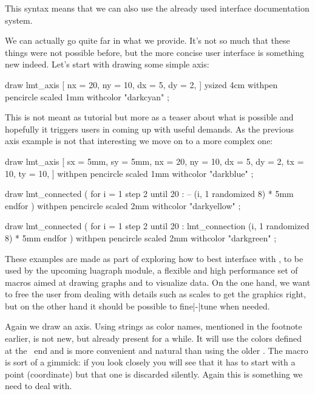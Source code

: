 This syntax means that we can also use the already used interface documentation
system.

We can actually go quite far in what we provide. It's not so much that these
things were not possible before, but the more concise user interface is something
new indeed. Let's start with drawing some simple axis:

\startbuffer
{}
    draw lmt_axis [
        nx =  20, ny =  10,
        dx =   5, dy =   2,
    ] ysized 4cm
        withpen pencircle scaled 1mm
        withcolor "darkcyan" ;
\stopMPcode
\stopbuffer

\typebuffer[option=TEX]

\startlinecorrection
\getbuffer
\stoplinecorrection

This  is not meant as tutorial but more as a teaser about what is
possible and hopefully it triggers users in coming up with useful demands. As the
previous axis example is not that interesting we move on to a more complex one:

\startbuffer
{}
    draw lmt_axis [
        sx =   5mm, sy =   5mm,
        nx =  20,   ny =  10,
        dx =   5,   dy =   2,
        tx =  10,   ty =  10,
    ] withpen pencircle scaled 1mm withcolor "darkblue" ;

    draw lmt_connected (
        for i = 1 step 2 until 20 :
            -- (i, 1 randomized 8) * 5mm
        endfor
    )
        withpen pencircle scaled 2mm withcolor "darkyellow" ;

    draw lmt_connected (
        for i = 1 step 2 until 20 :
            lmt_connection (i, 1 randomized 8) * 5mm
        endfor
    )
        withpen pencircle scaled 2mm withcolor "darkgreen" ;
\stopMPcode
\stopbuffer

\typebuffer[option=TEX]

\startlinecorrection
\getbuffer
\stoplinecorrection

These examples are made as part of exploring how to best interface with
\METAPOST, to be used by the upcoming luagraph module, a flexible and high
performance set of macros aimed at drawing graphs and to visualize data. On the
one hand, we want to free the user from dealing with details such as scales to
get the graphics right, but on the other hand it should be possible to
fine|-|tune when needed.

Again we draw an axis. Using strings as color names, mentioned in the footnote
earlier, is not new, but already present for a while. It will use the colors
defined at the \TEX\ end and is more convenient and natural than using the older
\type {\MPcolor}. The  macro is sort of a gimmick: if you
look closely you will see that it has to start with a point (coordinate) but that
one is discarded silently. Again this is something we need to deal with.

